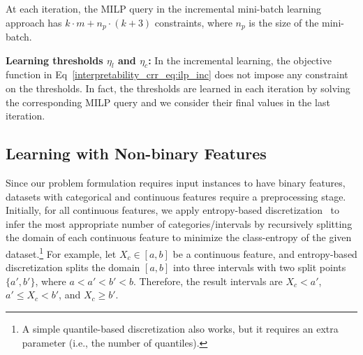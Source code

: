 
\begin{proposition}
	At each iteration, the MILP query in the incremental mini-batch learning approach has $ k\cdot m + n_p \cdot (k+3) $  constraints, where $ n_p $  is the size of the mini-batch. 
\end{proposition}

\textbf{Learning thresholds $ \eta_l $ and $ \eta_c $:} In the incremental learning, the objective function in Eq~\ref{interpretability_crr_eq:ilp_inc} does not impose any constraint on the thresholds. In fact, the thresholds are learned in each iteration by solving the corresponding MILP query and we  consider their final values in the last iteration.  





\subsection{Learning with Non-binary Features}
\label{interpretability_crr_sec:discretization}
Since our problem formulation requires input instances to have binary features, datasets with categorical and continuous features  require a preprocessing stage. Initially, for all continuous features, we apply entropy-based discretization~\cite{fayyad1993multi} to infer the most appropriate number of categories/intervals by recursively splitting the domain of each continuous feature to minimize the class-entropy of the given dataset.\footnote{A simple quantile-based discretization also works, but it requires an extra parameter (i.e., the number of quantiles).}  For example, let $ X_c \in [a,b] $ be a continuous feature, and  entropy-based discretization splits the domain $ [a,b] $ into three intervals with two split points $ \{a',b'\} $, where $ a<a'<b'<b $.  Therefore, the result intervals are $ { X_c < a'} $, $ {a' \le X_c < b'} $, and $ { X_c  \ge b'} $.

